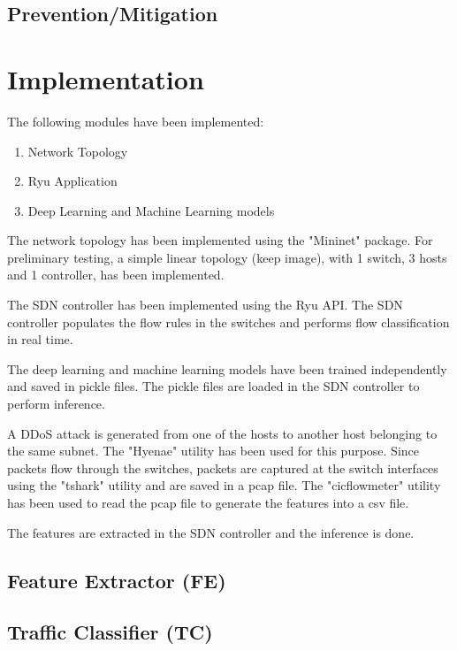 \documentclass[10pt,twocolumn,letterpaper]{article}
\begin{document}
\subsection{Prevention/Mitigation} %

\section{Implementation}
The following modules have been implemented:
\begin{enumerate}
\itemsep-0.81em
  \item Network Topology
  \item Ryu Application
  \item Deep Learning and Machine Learning models
\end{enumerate}
\par The network topology has been implemented using the "Mininet" package. 
For preliminary testing, a simple linear topology (keep image), with 1 switch, 3 hosts and 1 controller, has been implemented.
\par The SDN controller has been implemented using the Ryu API. The SDN controller populates the flow rules in the switches and performs flow classification in real time.
\par The deep learning and machine learning models have been trained independently and saved in pickle files. The pickle files are loaded in the SDN controller to perform inference.
\par A DDoS attack is generated from one of the hosts to another host belonging to the same subnet. The "Hyenae" utility has been used for this purpose. Since packets flow through the switches, packets are captured at the switch interfaces using the "tshark" utility and are saved in a pcap file. The "cicflowmeter" utility has been used to read the pcap file to generate the features into a csv file.
\par The features are extracted in the SDN controller and the inference is done.

\subsection{Feature Extractor (FE)}


\subsection{Traffic Classifier (TC)}
\end{document}
